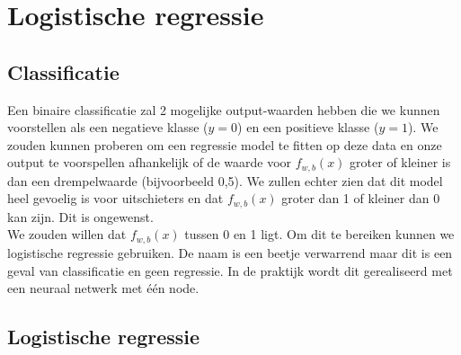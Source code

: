 \section{Logistische regressie }

\subsection{Classificatie}
Een binaire classificatie zal 2 mogelijke output-waarden hebben die we kunnen voorstellen als een negatieve klasse ($y = 0$) en een positieve klasse ($y = 1$).  We zouden kunnen proberen om een regressie model te fitten op deze data en onze output te voorspellen afhankelijk of de waarde voor $f_{w,b}(x)$ groter of kleiner is dan een drempelwaarde (bijvoorbeeld 0,5). We zullen echter zien dat dit model heel gevoelig is voor uitschieters en dat $f_{w,b}(x)$ groter dan 1 of kleiner dan 0 kan zijn. Dit is ongewenst.\\
\newline
We zouden willen dat $f_{w,b}(x)$ tussen 0 en 1 ligt. Om dit te bereiken kunnen we logistische regressie gebruiken. De naam is een beetje verwarrend maar dit is een geval van classificatie en geen regressie. In de praktijk wordt dit gerealiseerd met een neuraal netwerk met één node. 

\subsection{Logistische regressie }